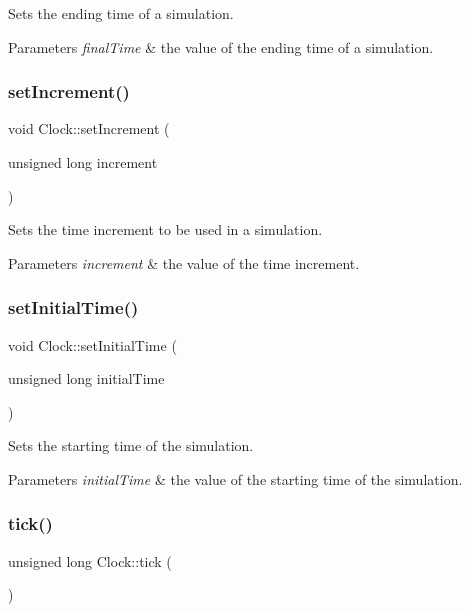 Sets the ending time of a simulation. 
\begin{DoxyParams}{Parameters}
{\em final\+Time} & the value of the ending time of a simulation. \\
\hline
\end{DoxyParams}
\mbox{\label{class_clock_a1ae60dca4e41f6e27d6104ec618c02f1}} 
\subsubsection{\texorpdfstring{setIncrement()}{setIncrement()}}
{\footnotesize\ttfamily void Clock\+::set\+Increment (\begin{DoxyParamCaption}\item[{unsigned long}]{increment }\end{DoxyParamCaption})}

Sets the time increment to be used in a simulation. 
\begin{DoxyParams}{Parameters}
{\em increment} & the value of the time increment. \\
\hline
\end{DoxyParams}
\mbox{\label{class_clock_abe7fb8f715d0dcae08e52b2b7aed7db2}} 
\subsubsection{\texorpdfstring{setInitialTime()}{setInitialTime()}}
{\footnotesize\ttfamily void Clock\+::set\+Initial\+Time (\begin{DoxyParamCaption}\item[{unsigned long}]{initial\+Time }\end{DoxyParamCaption})}

Sets the starting time of the simulation. 
\begin{DoxyParams}{Parameters}
{\em initial\+Time} & the value of the starting time of the simulation. \\
\hline
\end{DoxyParams}
\mbox{\label{class_clock_ab7c857c5b43cf98d991435ba9ce46b2c}} 
\subsubsection{\texorpdfstring{tick()}{tick()}}
{\footnotesize\ttfamily unsigned long Clock\+::tick (\begin{DoxyParamCaption}{ }\end{DoxyParamCaption})}

